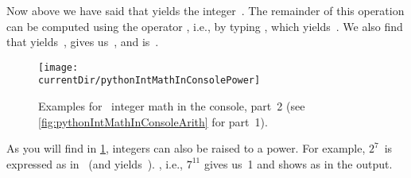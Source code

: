 
Now above we have said that  yields the integer~.
The remainder of this operation can be computed using the  operator \expandafter\pythonilIdx{\%}, i.e., by typing , which yields~.
We also find that \expandafter{} yields~, \expandafter{} gives us~, and \expandafter{} is~.

\begin{figure}%
\centering%
\texttt{[image: \\currentDir/pythonIntMathInConsolePower]}%
\caption{Examples for \python\ integer math in the console, part~2 (see \cref{fig:pythonIntMathInConsoleArith} for part~1).}%
\label{fig:pythonIntMathInConsolePower}%
\end{figure}%

As you will find in \cref{fig:pythonIntMathInConsolePower}, integers can also be raised to a power.
For example, $2^7$~is expressed as  in \python\ (and yields~).
, i.e., $7^{11}$ gives us~1 and shows as  in the output.

